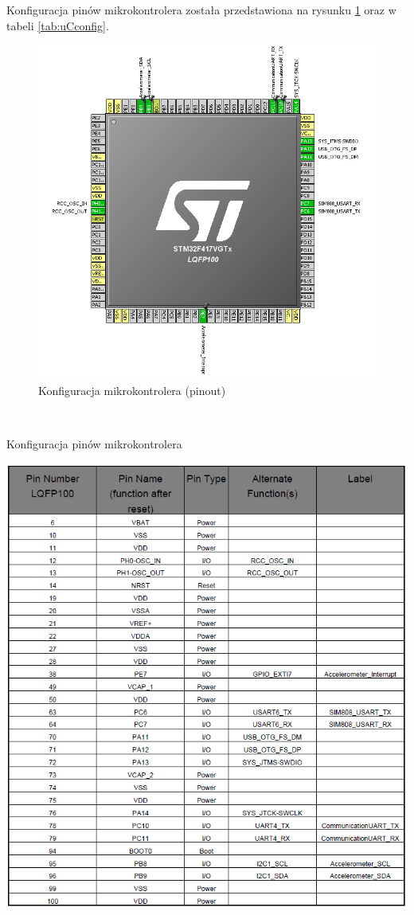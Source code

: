 \documentclass[10pt, a4paper]{article}
\begin{document}
Konfiguracja pinów mikrokontrolera została przedstawiona na rysunku \ref{fig:uCconfig} oraz w tabeli \ref{tab:uCconfig}.\\
\begin{figure}[!htb]
\centering
\includegraphics[height=0.6\textheight]{./KonfiguracjauC.PNG}
\caption{Konfiguracja mikrokontrolera (pinout) \label{fig:uCconfig}}
\end{figure}
\\
\begin{table}
\caption{Konfiguracja pinów mikrokontrolera \label{tab:uCconfig}}
\includegraphics[width=\textwidth]{./KonfiguracjaPeryTab.PNG}
\end{table}
\end{document}

